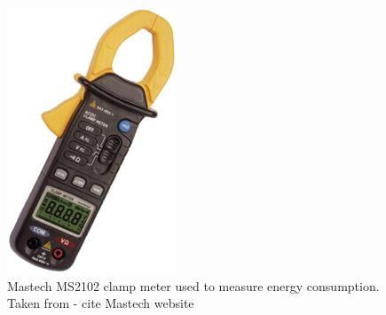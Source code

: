 \begin{figure}[]
  \centering
    \includegraphics[scale=2.5]{"img/clamp"}
    \caption{Mastech MS2102 clamp meter used to measure energy consumption. Taken from \cite{} - cite Mastech website}
    \label{fig:clamp}
\end{figure}


